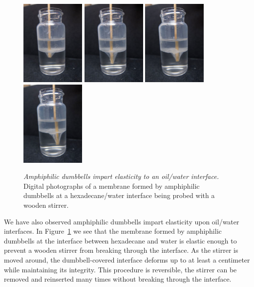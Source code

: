 \begin{figure}[htbp]
\centering
\includegraphics[width=1.25in]{figures/IMG_0911_reduced.pdf}
\hspace{0.2in}
\includegraphics[width=1.25in]{figures/IMG_0912_reduced.pdf}
\hspace{0.2in}
\includegraphics[width=1.25in]{figures/IMG_0913_reduced.pdf}
\hspace{0.2in}
\includegraphics[width=1.25in]{figures/IMG_0914_reduced.pdf}
\caption{\label{fig:NDBinterface2} \emph{Amphiphilic dumbbells impart elasticity to an oil/water interface.}
Digital photographs of a membrane formed by amphiphilic dumbbells at a hexadecane/water interface being probed with a wooden stirrer.}
\end{figure}

We have also observed amphiphilic dumbbells impart elasticity upon oil/water interfaces.
In Figure~\ref{fig:NDBinterface2} we see that the membrane formed by amphiphilic dumbbells at the interface between hexadecane and water is elastic enough to prevent a wooden stirrer from breaking through the interface.
As the stirrer is moved around, the dumbbell-covered interface deforms up to at least a centimeter while maintaining its integrity.
This procedure is reversible, the stirrer can be removed and reinserted many times without breaking through the interface.

